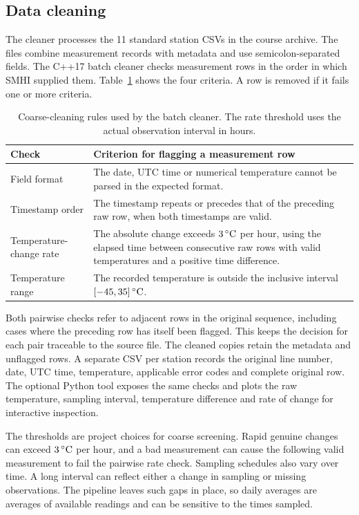 \subsection{Data cleaning}
\label{sec:cleaning}

The cleaner processes the 11 standard station CSVs in the course archive. The files combine measurement records with metadata and use semicolon-separated fields. The C++17 batch cleaner checks measurement rows in the order in which SMHI supplied them. Table~\ref{tab:checks} shows the four criteria. A row is removed if it fails one or more criteria.

\begin{table}[htbp]
\centering
\small
\begin{tabularx}{\linewidth}{@{}p{.25\linewidth}X@{}}
\toprule
Check & Criterion for flagging a measurement row \\
\midrule
Field format & The date, UTC time or numerical temperature cannot be parsed in the expected format. \\
Timestamp order & The timestamp repeats or precedes that of the preceding raw row, when both timestamps are valid. \\
Temperature-change rate & The absolute change exceeds \(3\,{}^\circ\mathrm{C}\) per hour, using the elapsed time between consecutive raw rows with valid temperatures and a positive time difference. \\
Temperature range & The recorded temperature is outside the inclusive interval \([-45,35]\,{}^\circ\mathrm{C}\). \\
\bottomrule
\end{tabularx}
\caption{Coarse-cleaning rules used by the batch cleaner. The rate threshold uses the actual observation interval in hours.}
\label{tab:checks}
\end{table}

Both pairwise checks refer to adjacent rows in the original sequence, including cases where the preceding row has itself been flagged. This keeps the decision for each pair traceable to the source file. The cleaned copies retain the metadata and unflagged rows. A separate CSV per station records the original line number, date, UTC time, temperature, applicable error codes and complete original row. The optional Python tool exposes the same checks and plots the raw temperature, sampling interval, temperature difference and rate of change for interactive inspection.

The thresholds are project choices for coarse screening. Rapid genuine changes can exceed \(3\,{}^\circ\mathrm{C}\) per hour, and a bad measurement can cause the following valid measurement to fail the pairwise rate check. Sampling schedules also vary over time. A long interval can reflect either a change in sampling or missing observations. The pipeline leaves such gaps in place, so daily averages are averages of available readings and can be sensitive to the times sampled.
